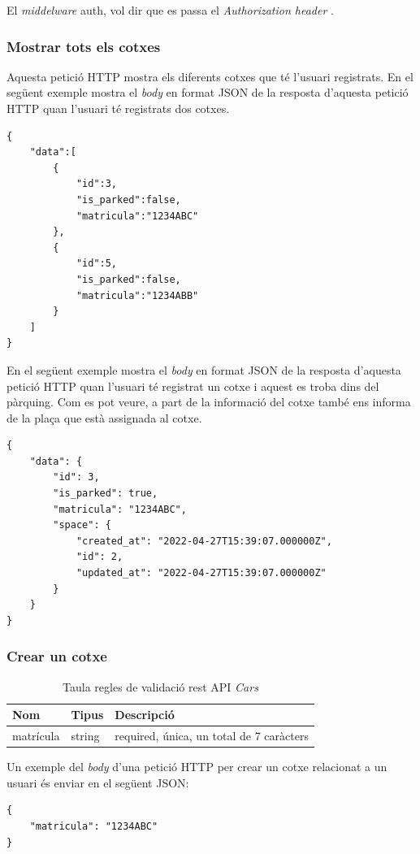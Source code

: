 El \emph{middelware} auth, vol dir que es passa el \emph{Authorization header} \autocite{middleware_laravel}.

\subsubsection{Mostrar tots els cotxes}
\label{sssec:mostrar_cotxes}

Aquesta petició HTTP mostra els diferents cotxes que té l'usuari registrats.
En el següent exemple mostra el \emph{body} en format JSON de la resposta d'aquesta
petició HTTP quan l'usuari té registrats dos cotxes.
\begin{verbatim}
{
    "data":[
        {
            "id":3,
            "is_parked":false,
            "matricula":"1234ABC"
        },
        {
            "id":5,
            "is_parked":false,
            "matricula":"1234ABB"
        }
    ]
}
\end{verbatim}

En el següent exemple mostra el \emph{body} en format JSON de la resposta d'aquesta
petició HTTP quan l'usuari té registrat un cotxe i aquest es troba dins del pàrquing.
Com es pot veure, a part de la informació del cotxe també ens informa de la plaça
que està assignada al cotxe.
\begin{verbatim}
{
    "data": {
        "id": 3,
        "is_parked": true,
        "matricula": "1234ABC",
        "space": {
            "created_at": "2022-04-27T15:39:07.000000Z",
            "id": 2,
            "updated_at": "2022-04-27T15:39:07.000000Z"
        }
    }
}
\end{verbatim}

\subsubsection{Crear un cotxe}
\label{sssec:crear_cotxe}

\begin{table}[H]
\centering
\begin{tabular}{lll}
\hline
\textbf{Nom} & \textbf{Tipus} & \textbf{Descripció} \\ \hline
matrícula              & string       &  required, única, un total de 7 caràcters     \\ \hline
\end{tabular}
\caption{Taula regles de validació rest API \emph{Cars}}
\label{tab:my-cars-validation-table}
\end{table}

Un exemple del \emph{body} d'una petició HTTP per crear un cotxe relacionat a un usuari és enviar
en el següent JSON:
\begin{verbatim}
{
    "matricula": "1234ABC"
}
\end{verbatim}

